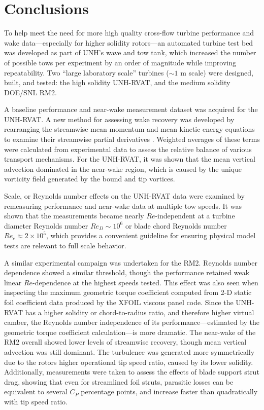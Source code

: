 \chapter{Conclusions}

To help meet the need for more high quality cross-flow turbine performance and
wake data---especially for higher solidity rotors---an automated turbine test
bed was developed as part of UNH's wave and tow tank, which increased the number
of possible tows per experiment by an order of magnitude while improving
repeatability. Two ``large laboratory scale'' turbines ($\sim 1$ m scale) were
designed, built, and tested: the high solidity UNH-RVAT, and the medium solidity
DOE/SNL RM2.

A baseline performance and near-wake measurement dataset was acquired for the
UNH-RVAT. A new method for assessing wake recovery was developed by rearranging
the streamwise mean momentum and mean kinetic energy equations to examine their
streamwise partial derivatives \cite{Bachant2015-JoT}. Weighted averages of
these terms were calculated from experimental data to assess the relative
balance of various transport mechanisms. For the UNH-RVAT, it was shown that the
mean vertical advection dominated in the near-wake region, which is caused by
the unique vorticity field generated by the bound and tip vortices.

Scale, or Reynolds number effects on the UNH-RVAT data were examined by
remeasuring performance and near-wake data at multiple tow speeds. It was shown
that the measurements became nearly $Re$-independent at a turbine diameter
Reynolds number $Re_D \sim 10^6$ or blade chord Reynolds number $Re_c \approx 2
\times 10^5$, which provides a convenient guideline for ensuring physical model
tests are relevant to full scale behavior.

A similar experimental campaign was undertaken for the RM2. Reynolds number
dependence showed a similar threshold, though the performance retained weak
linear $Re$-dependence at the highest speeds tested. This effect was also seen
when inspecting the maximum geometric torque coefficient computed from 2-D
static foil coefficient data produced by the XFOIL viscous panel code. Since the
UNH-RVAT has a higher solidity or chord-to-radius ratio, and therefore higher
virtual camber, the Reynolds number independence of its performance---estimated
by the geometric torque coefficient calculation---is more dramatic. The
near-wake of the RM2 overall showed lower levels of streamwise recovery, though
mean vertical advection was still dominant. The turbulence was generated more
symmetrically due to the rotors higher operational tip speed ratio, caused by
its lower solidity. Additionally, measurements were taken to assess the effects
of blade support strut drag, showing that even for streamlined foil struts,
parasitic losses can be equivalent to several $C_P$ percentage points, and
increase faster than quadratically with tip speed ratio.

